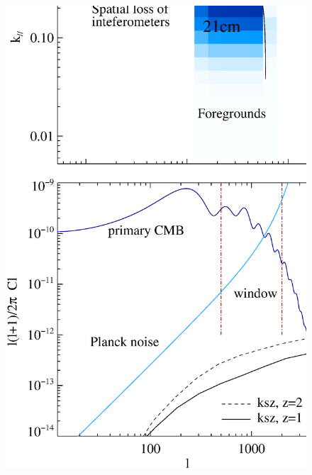 \begin{figure}[tbp]
\begin{minipage}[t]{\linewidth}
\vspace{-0.8cm}
\includegraphics[width=\textwidth]{figure/cmb_21cm.eps}
\vspace{-0.6cm}
\label{fig:cmb_21cm}
\end{minipage}
\begin{minipage}[t]{\linewidth}
\vspace{-0.8cm}

\end{minipage}
\end{figure}
